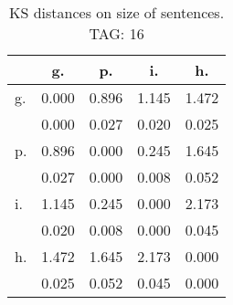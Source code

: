 \begin{table}[h!]
\begin{center}
\begin{tabular}{| l | c | c | c | c |}\hline
 & g. & p. & i. & h. \\\hline
g. & 0.000  & 0.896  & 1.145  & 1.472 \\\hline
 & 0.000  & 0.027  & 0.020  & 0.025 \\\hline
p. & 0.896  & 0.000  & 0.245  & 1.645 \\\hline
 & 0.027  & 0.000  & 0.008  & 0.052 \\\hline
i. & 1.145  & 0.245  & 0.000  & 2.173 \\\hline
 & 0.020  & 0.008  & 0.000  & 0.045 \\\hline
h. & 1.472  & 1.645  & 2.173  & 0.000 \\\hline
 & 0.025  & 0.052  & 0.045  & 0.000 \\\hline
\end{tabular}
\caption{KS distances on size of sentences. TAG: 16}
\end{center}
\end{table}